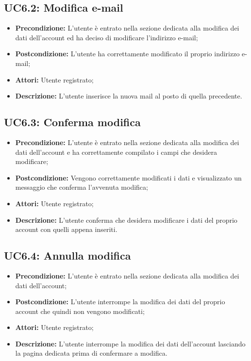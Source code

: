 \subsection{ UC6.2: Modifica e-mail}

\begin{itemize}
	\item \textbf{Precondizione:} L’utente è entrato nella sezione dedicata alla modifica dei dati dell’account ed ha deciso di modificare l’indirizzo e-mail;
	\item \textbf{Postcondizione:} L’utente ha correttamente modificato il proprio indirizzo e-mail;
	\item \textbf{Attori:} Utente registrato;
	\item \textbf{Descrizione:} L’utente inserisce la nuova mail al posto di quella precedente.
\end{itemize}
\subsection{ UC6.3: Conferma modifica}

\begin{itemize}
	\item \textbf{Precondizione:} L’utente è entrato nella sezione dedicata alla modifica dei dati dell’account e ha correttamente compilato i campi che desidera modificare;
	\item \textbf{Postcondizione:} Vengono correttamente modificati i dati e visualizzato un messaggio che conferma l’avvenuta modifica;
	\item \textbf{Attori:} Utente registrato;
	\item \textbf{Descrizione:} L’utente conferma che desidera modificare i dati del proprio account con quelli appena inseriti.
\end{itemize}
\subsection{ UC6.4: Annulla modifica}

\begin{itemize}
	\item \textbf{Precondizione:} L’utente è entrato nella sezione dedicata alla modifica dei dati dell’account;
	\item \textbf{Postcondizione:} L’utente interrompe la modifica dei dati del proprio account che quindi non vengono modificati;
	\item \textbf{Attori:} Utente registrato;
	\item \textbf{Descrizione:} L’utente interrompe la modifica dei dati dell’account lasciando la pagina dedicata prima di confermare a modifica.
\end{itemize}
